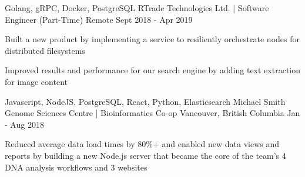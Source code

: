 \begin{cventries}
  \cventry
    {Golang, gRPC, Docker, PostgreSQL} %
    {RTrade Technologies Ltd. | Software Engineer (Part-Time)} %
    {Remote} %
    {Sept 2018 - Apr 2019} %
    {
      \begin{cvitems} %
        \item {Built a new product by implementing a service to resiliently orchestrate nodes for distributed filesystems}
        \item {Improved results and performance for our search engine by adding text extraction for image content}
      \end{cvitems}
    }

  \cventry
    {Javascript, NodeJS, PostgreSQL, React, Python, Elasticsearch} %
    {Michael Smith Genome Sciences Centre | Bioinformatics Co-op} %
    {Vancouver, British Columbia} %
    {Jan - Aug 2018} %
    {
      \begin{cvitems} %
        \item {Reduced average data load times by 80\%+ and enabled new data views and reports by building a new Node.js server that became the core of the team’s 4 DNA analysis workflows and 3 websites}
      \end{cvitems}
    }

\end{cventries}
